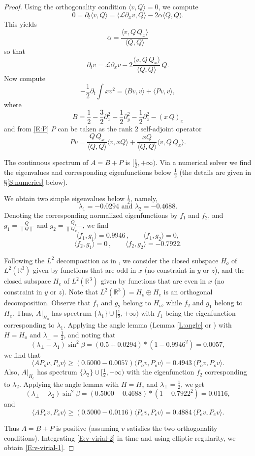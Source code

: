 \documentclass[12pt,letterpaper]{amsart}
\newcommand{\la}{\langle}
\newcommand{\ra}{\rangle}
\theoremstyle{remark}
\numberwithin{equation}{section}
\numberwithin{theorem}{section}
\numberwithin{table}{section}
\begin{document}
\begin{proof}
Using the orthogonality condition $\la v,Q \ra =0$, we compute
$$
0= \partial_t \la v, Q \ra = \la \mathcal{L}\partial_x v, Q \ra -2 \alpha \la Q, Q \ra.
$$
This yields 
$$
\alpha = \frac{\la v,  Q \, Q_x \ra}{\la Q, Q \ra}
$$
so that
\begin{equation}\label{E:P}
\partial_t v = \mathcal{L} \partial_x v - 2 \frac{\la v, Q \, Q_x \ra}{\la Q, Q\ra}\, Q.
\end{equation}
Now compute
\begin{equation}
\label{E:v-virial-2}
-\frac12 \partial_t \int x v^2 = \la Bv,v\ra + \la P v,v\ra,
\end{equation}
where
$$
B = \frac12 - \frac32\partial_x^2 - \frac12\partial_y^2 - \frac12\partial_z^2 - (x \,Q)_x
$$
and from \eqref{E:P} $P$ can be taken as the rank $2$ self-adjoint operator
$$
Pv = \frac{ Q \, Q_x}{\la Q, Q\ra} \la v, xQ\ra + \frac{xQ}{\la Q, Q\ra} \la v, Q \, Q_x\ra.
$$


The continuous spectrum of $A=B+P$ is $[\frac12,+\infty)$.  Via a numerical solver we find the eigenvalues and corresponding eigenfunctions below $\frac12$ (the details are given in \S \ref{S:numerics} below).

We obtain two simple eigenvalues below $\frac12$, namely,
$$
\lambda_1=-0.0294 \text{ and } \lambda_2=-0.4688.
$$  
Denoting the corresponding normalized eigenfunctions by $f_1$ and $f_2$,  and $g_1 = \frac{Q}{\|Q\|}$ and $g_2 = \frac{Q_x}{\|Q_x\|}$, we find
$$\la f_1, g_1 \ra =0.9946 \,, \qquad \la f_1,g_2 \ra = 0,$$
$$\la f_2, g_1 \ra = 0  \,, \qquad \la f_2, g_2 \ra = -0.7922.$$

Following the $L^2$ decomposition as in \cite[Lemma 14.2]{FHRY}, we consider the closed subspace $H_o$ of $L^2(\mathbb{R}^3)$ given by functions that are odd in $x$ (no constraint in $y$ or $z$), and the closed subspace $H_e$ of $L^2(\mathbb{R}^3)$ given by functions that are even in $x$ (no constraint in $y$ or $z$). Note that $L^2(\mathbb{R}^3) = H_o \oplus H_e$ is an orthogonal decomposition.  Observe that $f_1$ and $g_2$ belong to $H_o$, while $f_2$ and $g_1$ belong to $H_e$.   Thus, $A\big|_{H_o}$ has spectrum $\{ \lambda_1 \} \cup [\frac12, +\infty)$ with $f_1$ being the eigenfunction corresponding to $\lambda_1$.  
Applying the angle lemma (Lemma \ref{L:angle} or \cite[Lemma 14.3]{FHRY}) with $H=H_o$ and $\lambda_\perp = \frac12$, and noting that
$$
(\lambda_\perp - \lambda_1) \sin^2\beta = (0.5 + 0.0294)*(1-0.9946^2) = 0.0057,
$$
we find that
$$
\la AP_o v, P_o v \ra \geq (0.5000- 0.0057) \la P_ov, P_o v \ra = 0.4943 \, \la P_ov, P_o v \ra.
$$
Also, $A\big|_{H_e}$ has spectrum $\{ \lambda_2 \} \cup [\frac12, +\infty)$ with the eigenfunction $f_2$ corresponding to $\lambda_2$.  
Applying the angle lemma with $H=H_e$ and $\lambda_\perp = \frac12$, we get
$$
(\lambda_\perp - \lambda_2) \sin^2\beta = (0.5000-0.4688)*(1-0.7922^2)=0.0116,
$$ 
and 
$$
\la AP_e v, P_e v \ra \geq (0.5000-0.0116)\la P_e v, P_e v\ra=0.4884\,\la P_e v,P_e v\ra.
$$

Thus $A=B+P$ is positive (assuming $v$ satisfies the two orthogonality conditions). Integrating \eqref{E:v-virial-2} in time and using elliptic regularity, we obtain \eqref{E:v-virial-1}.
\end{proof}
\end{document}
